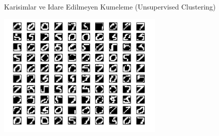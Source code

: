 \documentclass[12pt,fleqn]{article}\usepackage{../common}
\begin{document}
Karisimlar ve Idare Edilmeyen Kumeleme (Unsupervised Clustering)



\includegraphics[height=6cm]{digits.png}
\end{document}
